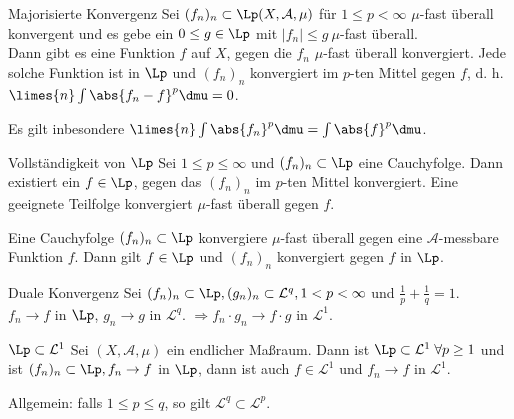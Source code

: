 \begin{karte}{Majorisierte Konvergenz}
    Sei \( (f_n)_n \subset \Lp(X, \mathcal{A}, \mu) \) 
    für \( 1 \leq p < \infty \) \( \mu \)-fast überall konvergent 
    und es gebe ein \( 0 \leq g \in \Lp \) mit 
    \( |f_n| \leq g \ \mu \)-fast überall.\\
    Dann gibt es eine Funktion \( f \) auf \(X\), 
    gegen die \(f_n\) \( \mu \)-fast überall konvergiert. 
    Jede solche Funktion ist in \( \Lp \) und 
    \( (f_n)_n \) konvergiert im \(p\)-ten Mittel gegen \(f\), 
    d. h. \( \limes{n} \int \abs{f_n - f}^p \dmu = 0 \).

    Es gilt inbesondere \(\limes{n} \int \abs{f_n}^p \dmu = \int \abs{f}^p \dmu \).
\end{karte}

\begin{karte}{Vollständigkeit von \( \Lp \)}
    Sei \( 1 \leq p \leq \infty \) und \( (f_n)_n \subset \Lp \)
    eine Cauchyfolge. Dann existiert ein \( f\in \Lp \), 
    gegen das \( (f_n)_n \) im \(p\)-ten Mittel konvergiert. 
    Eine geeignete Teilfolge konvergiert \(\mu\)-fast überall gegen \(f\).

    Eine Cauchyfolge \( (f_n)_n \subset \Lp \) konvergiere 
    \( \mu \)-fast überall gegen eine \( \mathcal{A} \)-messbare Funktion 
    \(f\). Dann gilt 
    \( f\in \Lp \) und \( (f_n)_n \) konvergiert gegen \(f\) in \(\Lp\).
\end{karte}

\begin{karte}{Duale Konvergenz}
    Sei \( (f_n)_n \subset \Lp, (g_n)_n \subset \mathcal{L}^q, 
    1 < p < \infty \) und \( \frac{1}{p} + \frac{1}{q} = 1 \).\\
    \( f_n \rightarrow f \) in \(\Lp\), 
    \( g_n \rightarrow g \) in \( \mathcal{L}^q \).
    \( \Rightarrow f_n \cdot g_n \rightarrow f \cdot g \) in \( \mathcal{L}^1 \).
\end{karte}

\begin{karte}{\( \Lp \subset \mathcal{L}^1 \)}
    Sei \( (X, \mathcal{A}, \mu) \) ein endlicher Maßraum. 
    Dann ist \( \Lp \subset \mathcal{L}^1 \;\forall p \geq 1 \) und 
    ist \( (f_n)_n \subset \Lp, f_n \rightarrow f \) in \(\Lp\), 
    dann ist auch \( f \in \mathcal{L}^1 \) und 
    \( f_n \rightarrow f \) in \( \mathcal{L}^1 \).

	Allgemein: falls \( 1 \leq p \leq q \), so gilt \( \mathcal{L}^q \subset \mathcal{L}^p \).
\end{karte}